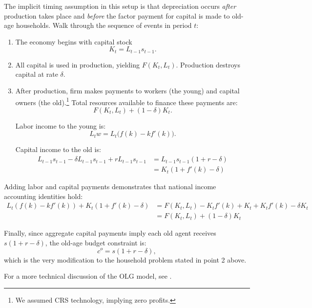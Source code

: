 \documentclass[11pt]{article}
\begin{document}
The implicit timing assumption in this setup is that depreciation occurs \emph{after} production takes place and \emph{before} the factor payment for capital is made to old-age households. Walk through the sequence of events in period \(t\):

\begin{enumerate}
    \item The economy begins with capital stock
    \[
        K_t = L_{t-1} s_{t-1}.
    \]
    
    \item All capital is used in production, yielding \(F(K_t, L_t)\). Production destroys capital at rate \(\delta\).
    
    \item After production, firm makes payments to workers (the young) and capital owners (the old).\footnote{We assumed CRS technology, implying zero profits.} Total resources available to finance these payments are:
    \[
        F(K_t, L_t) + (1-\delta)K_t.
    \]
    
    Labor income to the young is:
    \[
        L_t w = L_t \bigl(f(k) - k f'(k)\bigr).
    \]
    
    Capital income to the old is:
    \begin{align*}
        L_{t-1} s_{t-1} - \delta L_{t-1} s_{t-1} + r L_{t-1} s_{t-1} &= L_{t-1} s_{t-1} (1 + r - \delta) \\
        &= K_t (1 + f'(k) - \delta)
    \end{align*}
\end{enumerate}

Adding labor and capital payments demonstrates that national income accounting identities hold:
\begin{align*}
    L_t (f(k) - k f'(k)) + K_t (1 + f'(k) - \delta)
    &= F(K_t, L_t) - K_t f'(k) + K_t + K_t f'(k) - \delta K_t \\
    &= F(K_t, L_t) + (1-\delta)K_t
\end{align*}

Finally, since aggregate capital payments imply each old agent receives \(s(1 + r - \delta)\), the old-age budget constraint is:
\[
    c^o = s(1 + r - \delta),
\]
which is the very modification to the household problem stated in point 2 above.

For a more technical discussion of the OLG model, see \textcite{mukoyama2020olg}.

\ifnotlatexml
\printbibliography
\else


\fi
\end{document}
